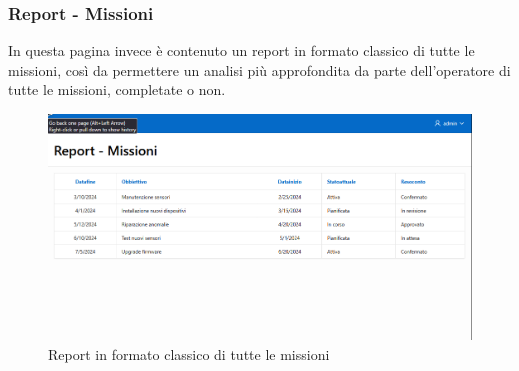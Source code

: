 \subsubsection{Report - Missioni}
In questa pagina invece è contenuto un report in formato classico di
tutte le missioni, così da permettere un analisi più approfondita da
parte dell'operatore di tutte le missioni, completate o non.
\begin{figure}[ht]
    \centering
    \includegraphics[width=\linewidth]{images/report-missioni.png}
    \caption{Report in formato classico di tutte le missioni}
    \label{fig:missioni}
  \end{figure}
